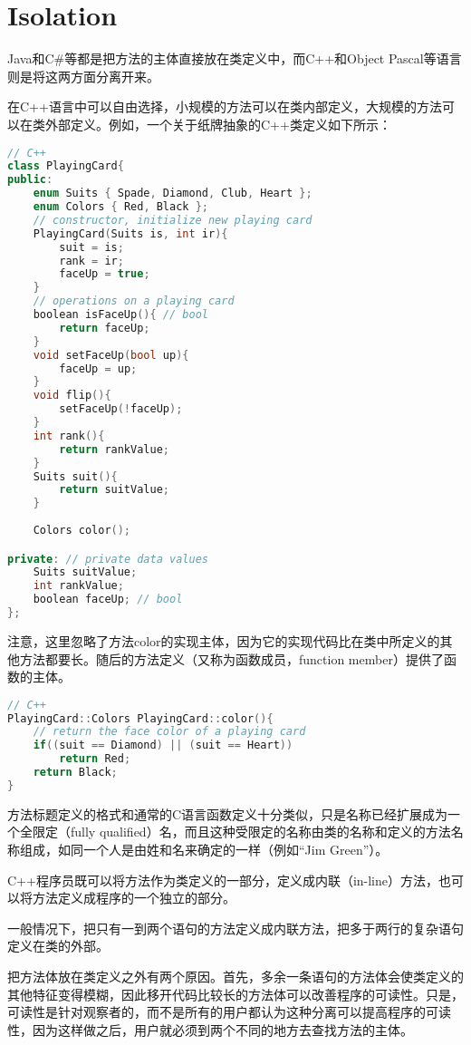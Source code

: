 \section{Isolation}

Java和C\#等都是把方法的主体直接放在类定义中，而C++和Object Pascal等语言则是将这两方面分离开来。

在C++语言中可以自由选择，小规模的方法可以在类内部定义，大规模的方法可以在类外部定义。例如，一个关于纸牌抽象的C++类定义如下所示：

\begin{lstlisting}[language=C++]
// C++ 
class PlayingCard{
public:
	enum Suits { Spade, Diamond, Club, Heart };
	enum Colors { Red, Black };
	// constructor, initialize new playing card
	PlayingCard(Suits is, int ir){
		suit = is;
		rank = ir;
		faceUp = true;
	}
	// operations on a playing card
	boolean isFaceUp(){ // bool
		return faceUp;
	}
	void setFaceUp(bool up){
		faceUp = up;
	}
	void flip(){
		setFaceUp(!faceUp);
	}
	int rank(){
		return rankValue;
	}
	Suits suit(){
		return suitValue;
	}
	
	Colors color();

private: // private data values
	Suits suitValue;
	int rankValue;
	boolean faceUp; // bool
};
\end{lstlisting}

注意，这里忽略了方法color的实现主体，因为它的实现代码比在类中所定义的其他方法都要长。随后的方法定义（又称为函数成员，function member）提供了函数的主体。


\begin{lstlisting}[language=C++]
// C++
PlayingCard::Colors PlayingCard::color(){
	// return the face color of a playing card
	if((suit == Diamond) || (suit == Heart))
		return Red;
	return Black;
}
\end{lstlisting}

方法标题定义的格式和通常的C语言函数定义十分类似，只是名称已经扩展成为一个全限定（fully qualified）名，而且这种受限定的名称由类的名称和定义的方法名称组成，如同一个人是由姓和名来确定的一样（例如“Jim Green”）。

C++程序员既可以将方法作为类定义的一部分，定义成内联（in-line）方法，也可以将方法定义成程序的一个独立的部分。

一般情况下，把只有一到两个语句的方法定义成内联方法，把多于两行的复杂语句定义在类的外部。



把方法体放在类定义之外有两个原因。首先，多余一条语句的方法体会使类定义的其他特征变得模糊，因此移开代码比较长的方法体可以改善程序的可读性。只是，可读性是针对观察者的，而不是所有的用户都认为这种分离可以提高程序的可读性，因为这样做之后，用户就必须到两个不同的地方去查找方法的主体。

